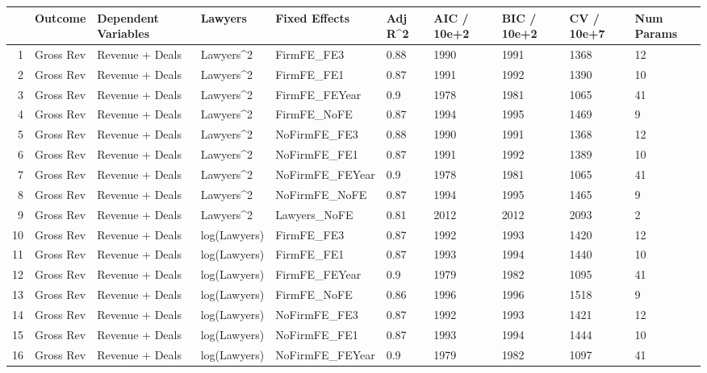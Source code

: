 \begin{table}[ht]
\centering
\begin{tabular}{rlllllllll}
  \hline
 & Outcome & Dependent Variables & Lawyers & Fixed Effects & Adj R^2 & AIC / 10e+2 & BIC / 10e+2 & CV / 10e+7 & Num Params \\ 
  \hline
1 & Gross Rev & Revenue + Deals & Lawyers^2 & FirmFE\_FE3 & 0.88 & 1990 & 1991 & 1368 & 12 \\ 
  2 & Gross Rev & Revenue + Deals & Lawyers^2 & FirmFE\_FE1 & 0.87 & 1991 & 1992 & 1390 & 10 \\ 
  3 & Gross Rev & Revenue + Deals & Lawyers^2 & FirmFE\_FEYear & 0.9 & 1978 & 1981 & 1065 & 41 \\ 
  4 & Gross Rev & Revenue + Deals & Lawyers^2 & FirmFE\_NoFE & 0.87 & 1994 & 1995 & 1469 & 9 \\ 
  5 & Gross Rev & Revenue + Deals & Lawyers^2 & NoFirmFE\_FE3 & 0.88 & 1990 & 1991 & 1368 & 12 \\ 
  6 & Gross Rev & Revenue + Deals & Lawyers^2 & NoFirmFE\_FE1 & 0.87 & 1991 & 1992 & 1389 & 10 \\ 
  7 & Gross Rev & Revenue + Deals & Lawyers^2 & NoFirmFE\_FEYear & 0.9 & 1978 & 1981 & 1065 & 41 \\ 
  8 & Gross Rev & Revenue + Deals & Lawyers^2 & NoFirmFE\_NoFE & 0.87 & 1994 & 1995 & 1465 & 9 \\ 
  9 & Gross Rev & Revenue + Deals & Lawyers^2 & Lawyers\_NoFE & 0.81 & 2012 & 2012 & 2093 & 2 \\ 
  10 & Gross Rev & Revenue + Deals & log(Lawyers) & FirmFE\_FE3 & 0.87 & 1992 & 1993 & 1420 & 12 \\ 
  11 & Gross Rev & Revenue + Deals & log(Lawyers) & FirmFE\_FE1 & 0.87 & 1993 & 1994 & 1440 & 10 \\ 
  12 & Gross Rev & Revenue + Deals & log(Lawyers) & FirmFE\_FEYear & 0.9 & 1979 & 1982 & 1095 & 41 \\ 
  13 & Gross Rev & Revenue + Deals & log(Lawyers) & FirmFE\_NoFE & 0.86 & 1996 & 1996 & 1518 & 9 \\ 
  14 & Gross Rev & Revenue + Deals & log(Lawyers) & NoFirmFE\_FE3 & 0.87 & 1992 & 1993 & 1421 & 12 \\ 
  15 & Gross Rev & Revenue + Deals & log(Lawyers) & NoFirmFE\_FE1 & 0.87 & 1993 & 1994 & 1444 & 10 \\ 
  16 & Gross Rev & Revenue + Deals & log(Lawyers) & NoFirmFE\_FEYear & 0.9 & 1979 & 1982 & 1097 & 41 \\ 

\end{tabular}
\end{table}
